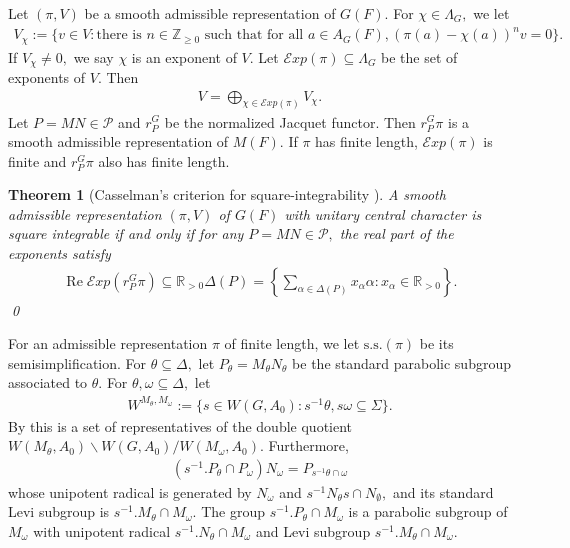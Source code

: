 \documentclass[10pt]{amsart}
\newtheorem{theorem}{Theorem}[section]
\theoremstyle{definition}
\numberwithin{equation}{section}
\numberwithin{equation}{subsection}
\newcommand{\ZZ}{\mathbb{Z}}
\newcommand{\RR}{\mathbb{R}}
\renewcommand{\Re}{\mathop{\mathrm{Re}}}
\begin{document}
Let $(\pi,V)$ be a smooth admissible representation of $G(F)$. For $\chi\in \Lambda_G,$ we let
\begin{align*}
     V_\chi:=\{v \in V : \textrm{there is } n \in \ZZ_{\ge 0} \textrm{ such that for all } a \in A_G(F), (\pi(a)-\chi(a))^n v = 0\}.
\end{align*}
If $V_\chi\neq 0,$ we say $\chi$ is an exponent of $V$. Let $\mathcal{E}xp(\pi)\subseteq \Lambda_G$ be the set of exponents of $V$. Then
\begin{align*}
    V=\bigoplus_{\chi\in \mathcal{E}xp(\pi)} V_\chi.
\end{align*}
Let $P=MN\in \mathcal{P}$ and $r^G_P$ be the normalized Jacquet functor. Then $r^G_P \pi$ is a smooth admissible representation of $M(F)$. If $\pi$ has finite length, $\mathcal{E}xp(\pi)$ is finite and $r^G_P \pi$ also has finite length.  
\begin{theorem}[Casselman's criterion for square-integrability {\cite[VII.1.2]{Representation-p-adic}}]\label{CasselmanCriterion}
    A smooth admissible representation $(\pi,V)$ of $G(F)$ with unitary central character is square integrable if and only if for any $P=MN\in \mathcal{P},$ the real part of the exponents satisfy
    \begin{align*}
        \Re \mathcal{E}xp(r^G_P\pi)\subseteq \RR_{>0}\Delta(P)= \left\{\sum_{\alpha\in\Delta(P)} x_\alpha \alpha: x_\alpha\in \RR_{>0}\right\}.
    \end{align*}\qed
\end{theorem}

For an admissible representation $\pi$ of finite length, we let $\mathrm{s.s.}(\pi)$ be its semisimplification. For $\theta\subseteq \Delta,$ let $P_\theta=M_\theta N_\theta$ be the standard parabolic subgroup associated to $\theta$. For $\theta,\omega\subseteq \Delta,$ let 
\begin{align*}
    W^{M_\theta,M_\omega} := \{s\in W(G,A_0):s^{-1}\theta, s\omega\subseteq \Sigma\}.
\end{align*}
By \cite[V.4.6]{Representation-p-adic} this is a set of representatives of the double quotient $W(M_\theta,A_0)\backslash W(G,A_0)/W(M_\omega,A_0)$. Furthermore, 
\begin{align*}
    (s^{-1}.P_\theta\cap P_\omega)N_\omega=P_{s^{-1}\theta\cap \omega}
\end{align*}
whose unipotent radical is generated by $N_\omega$ and $s^{-1}N_\theta s\cap N_\emptyset,$ and its standard Levi subgroup is $s^{-1}.M_\theta\cap M_\omega.$ The group $s^{-1}.P_\theta\cap M_\omega$ is a parabolic subgroup of $M_\omega$ with unipotent radical $s^{-1}.N_\theta  \cap M_\omega$ and Levi subgroup $s^{-1}.M_\theta \cap M_\omega$.
\end{document}
